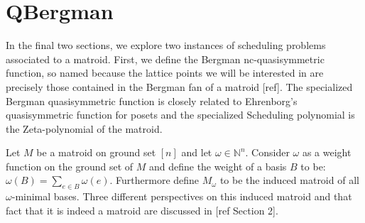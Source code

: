 \documentclass[12pt,reqno]{amsart}
\numberwithin{definition}{section}
\theoremstyle{definition}
\begin{document}




\section{QBergman}

In the final two sections, we explore two instances of scheduling
problems associated to a matroid.  First, we define the Bergman
nc-quasisymmetric function, so named because the lattice points we will be
interested in are precisely those contained in the Bergman fan of a
matroid [ref].  The specialized Bergman quasisymmetric function is
closely related to Ehrenborg's quasisymmetric function for posets and
the specialized Scheduling polynomial is the Zeta-polynomial of the
matroid.









Let $M$ be a matroid on ground set $[n]$ and let $\omega \in \mathbb{N}^n$.
Consider $\omega$ as a weight function on the ground set of $M$ and define the weight of a basis $B$ to be: $\omega(B) = \sum_{e\in B} \omega(e)$. 
Furthermore define $M_{\omega}$ to be the induced matroid of all
$\omega$-minimal bases.  Three different perspectives on this induced
matroid and that fact that it is indeed a matroid are discussed in [ref Section 2].
\end{document}

